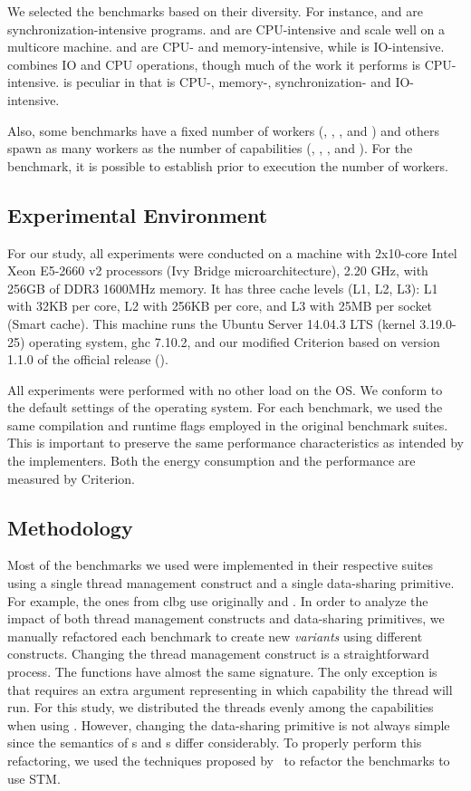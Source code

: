 We selected the benchmarks based on their diversity. For instance, \chameneos and \dining are synchronization-intensive programs. \mandelbrot and \spectral are CPU-intensive and scale well on a multicore machine. \knucleotide and \regex are CPU- and memory-intensive, while \warp is IO-intensive. \tsearch combines IO and CPU operations, though much of the work it performs is CPU-intensive. \fasta is peculiar in that is CPU-, memory-, synchronization- and IO-intensive.

Also, some benchmarks have a fixed number of workers (\chameneos, \knucleotide, \regex, and \dining) and others spawn as many workers as the number of capabilities (\fasta, \mandelbrot, \spectral, \tsearch and \warp). For the \dining benchmark, it is possible to establish prior to execution the number of workers.

\subsection{Experimental Environment}
For our study, all experiments were conducted on a machine with 2x10-core Intel Xeon E5-2660 v2 processors (Ivy Bridge microarchitecture), 2.20 GHz, with 256GB of DDR3 1600MHz memory. It has three cache levels (L1, L2, L3): L1 with 32KB per core, L2 with 256KB per core, and L3 with 25MB per socket (Smart cache). This machine runs the Ubuntu Server 14.04.3 LTS (kernel 3.19.0-25) operating system, \acs{ghc} 7.10.2, and our modified Criterion based on version 1.1.0 of the official release ().

All experiments were performed with no other load on the OS. We conform to the default settings of the operating system. For each benchmark, we used the same compilation and runtime flags employed in the original benchmark suites. This is important to preserve the same performance characteristics as intended by the implementers. Both the energy consumption and the performance are measured by Criterion.

\subsection{Methodology}
Most of the benchmarks we used were implemented in their respective suites using a single thread management construct and a single data-sharing primitive. For example, the ones from \acs{clbg} use originally \forkIO and \MVar. In order to analyze the impact of both thread management constructs and data-sharing primitives, we manually refactored each benchmark to create new \emph{variants} using different constructs. Changing the thread management construct is a straightforward process. The functions have almost the same signature. The only exception is \forkOn that requires an extra argument representing in which capability the thread will run. For this study, we distributed the threads evenly among the capabilities when using \forkOn. However, changing the data-sharing primitive is not always simple since the semantics of {\TVar}s and {\MVar}s differ considerably. To properly perform this refactoring, we used the techniques proposed by~ to refactor the benchmarks to use STM.

